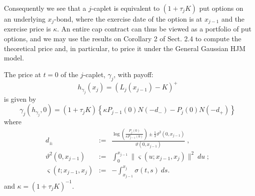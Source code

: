 Consequently we see that a $j$-caplet is equivalent to $(1+\tau_j K)$
put options on an underlying $x_j$-bond, where the exercise date of
the option is at $x_{j-1}$ and the exercise price is $\kappa$. An
entire cap contract can thus be viewed as a portfolio of put options,
and we may use the results on Corollary 2 of Sect. 2.4 to compute the
theoretical price and, in particular, to price it under the General
Gaussian HJM model.
\begin{propos} The price at $t=0$ of the $j$-caplet, $\gamma_j$, with
  payoff:
$$
h_{\gamma_j}(x_j)=(L_j(x_{j-1})-K)^+
$$
is given by
\begin{equation}
\label{GaussianForwardCaplet}
\gamma_j(h_{\gamma_j},0)=(1+\tau_j K)\left\{\kappa P_{j-1}(0)
  N(-d_-)-P_j(0) N(-d_+)\right\}
\end{equation} 
where
\begin{eqnarray}
\label{capletd+-} d_{\pm} & := & \displaystyle \frac{\log\left(\frac{P_j(0)}{\kappa 
      P_{j-1}(0)}\right)\pm\frac{1}{2}\vartheta^2(0,x_{j-1})}{\vartheta(0,x_{j-1})}\;  , \\  
\label{volmain} \vartheta^2(0,x_{j-1}) & := &\displaystyle
\int_0^{x_{j-1}} \| \varsigma(u;x_{j-1},x_j) \|^2\:du\; ;\\   
\label{volaux} \varsigma(t;x_{j-1},x_j) &  := & -\displaystyle
\int_{x_{j-1}}^{x_j} \sigma(t,s)\: ds.   
\end{eqnarray}
and $\kappa=(1+\tau_j K)^{-1}$.
\end{propos}


